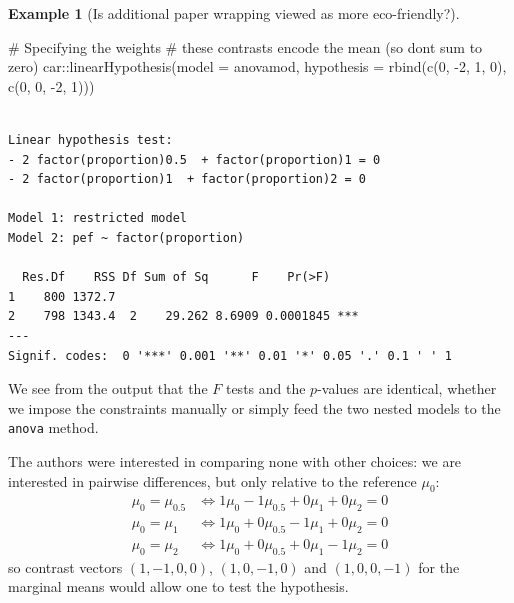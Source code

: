 \documentclass[
  11pt,
  letterpaper,
]{scrbook}
\newenvironment{Shaded}{\begin{snugshade}}{\end{snugshade}}
\newcommand{\AttributeTok}[1]{\textcolor[rgb]{0.40,0.45,0.13}{#1}}
\newcommand{\CommentTok}[1]{\textcolor[rgb]{0.37,0.37,0.37}{#1}}
\newcommand{\DecValTok}[1]{\textcolor[rgb]{0.68,0.00,0.00}{#1}}
\newcommand{\FunctionTok}[1]{\textcolor[rgb]{0.28,0.35,0.67}{#1}}
\newcommand{\NormalTok}[1]{\textcolor[rgb]{0.00,0.23,0.31}{#1}}
\newcommand{\SpecialCharTok}[1]{\textcolor[rgb]{0.37,0.37,0.37}{#1}}
\theoremstyle{definition}
\newtheorem{example}{Example}[chapter]
\theoremstyle{definition}
\theoremstyle{remark}
\begin{document}
\begin{example}[Is additional paper wrapping viewed as more
eco-friendly?]
\begin{Shaded}
\begin{Highlighting}[]
\CommentTok{\# Specifying the weights }
\CommentTok{\# these contrasts encode the mean (so don\textquotesingle{}t sum to zero)}
\NormalTok{car}\SpecialCharTok{::}\FunctionTok{linearHypothesis}\NormalTok{(}\AttributeTok{model =}\NormalTok{ anovamod, }
   \AttributeTok{hypothesis =} \FunctionTok{rbind}\NormalTok{(}\FunctionTok{c}\NormalTok{(}\DecValTok{0}\NormalTok{, }\SpecialCharTok{{-}}\DecValTok{2}\NormalTok{, }\DecValTok{1}\NormalTok{, }\DecValTok{0}\NormalTok{), }
                      \FunctionTok{c}\NormalTok{(}\DecValTok{0}\NormalTok{, }\DecValTok{0}\NormalTok{, }\SpecialCharTok{{-}}\DecValTok{2}\NormalTok{, }\DecValTok{1}\NormalTok{)))}
\end{Highlighting}
\end{Shaded}

\begin{verbatim}

Linear hypothesis test:
- 2 factor(proportion)0.5  + factor(proportion)1 = 0
- 2 factor(proportion)1  + factor(proportion)2 = 0

Model 1: restricted model
Model 2: pef ~ factor(proportion)

  Res.Df    RSS Df Sum of Sq      F    Pr(>F)    
1    800 1372.7                                  
2    798 1343.4  2    29.262 8.6909 0.0001845 ***
---
Signif. codes:  0 '***' 0.001 '**' 0.01 '*' 0.05 '.' 0.1 ' ' 1
\end{verbatim}

We see from the output that the \(F\) tests and the \(p\)-values are
identical, whether we impose the constraints manually or simply feed the
two nested models to the \texttt{anova} method.

The authors were interested in comparing none with other choices: we are
interested in pairwise differences, but only relative to the reference
\(\mu_{0}\): \begin{align*}
\mu_0 = \mu_{0.5}  & \iff 1\mu_0 - 1\mu_{0.5} + 0\mu_{1} + 0 \mu_{2} = 0\\
\mu_0 = \mu_{1} & \iff 1\mu_0 + 0\mu_{0.5} -1\mu_{1} + 0 \mu_{2} = 0\\
\mu_0 = \mu_{2} & \iff 1\mu_0 + 0\mu_{0.5} + 0\mu_{1} -1 \mu_{2} = 0
\end{align*} so contrast vectors \((1, -1, 0, 0)\), \((1, 0, -1, 0)\)
and \((1, 0, 0, -1)\) for the marginal means would allow one to test the
hypothesis.


\end{example}
\end{document}
